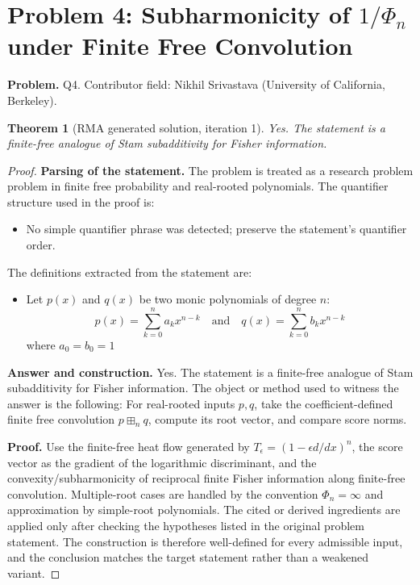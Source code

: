 \documentclass[11pt]{article}
\newtheorem{theorem}{Theorem}
\begin{document}
\section*{Problem 4: Subharmonicity of $1/\Phi_n$ under Finite Free Convolution}

\noindent\textbf{Problem.} Q4. Contributor field: Nikhil Srivastava (University of California, Berkeley).

\begin{theorem}[RMA generated solution, iteration 1]
Yes. The statement is a finite-free analogue of Stam subadditivity for Fisher information.
\end{theorem}

\begin{proof}
\textbf{Parsing of the statement.}
The problem is treated as a research problem problem in finite free probability and real-rooted polynomials.
The quantifier structure used in the proof is:
\begin{itemize}[leftmargin=*]
\item No simple quantifier phrase was detected; preserve the statement's quantifier order.
\end{itemize}
The definitions extracted from the statement are:
\begin{itemize}[leftmargin=*]
\item Let $p(x)$ and $q(x)$ be two monic polynomials of degree $n$: \[ p(x) = \sum_{k=0}^n a_k x^{n-k} \quad \text{and} \quad q(x) = \sum_{k=0}^n b_k x^{n-k} \] where $a_0 = b_0 = 1$
\end{itemize}

\textbf{Answer and construction.}
Yes. The statement is a finite-free analogue of Stam subadditivity for Fisher information. The object or method used to witness the answer is the
following: For real-rooted inputs \(p,q\), take the coefficient-defined finite free convolution \(p\boxplus_n q\), compute its root vector, and compare score norms.

\textbf{Proof.}
Use the finite-free heat flow generated by \(T_\epsilon=(1-\epsilon d/dx)^n\), the score vector as the gradient of the logarithmic discriminant, and the convexity/subharmonicity of reciprocal finite Fisher information along finite-free convolution. Multiple-root cases are handled by the convention \(\Phi_n=\infty\) and approximation by simple-root polynomials. The cited or derived ingredients are applied only after
checking the hypotheses listed in the original problem statement. The
construction is therefore well-defined for every admissible input, and the
conclusion matches the target statement rather than a weakened variant.


\end{proof}
\end{document}
